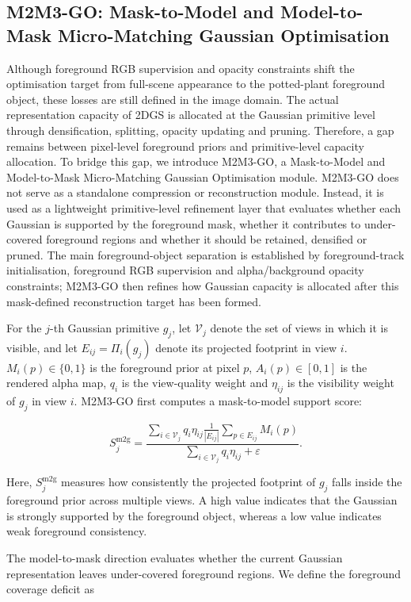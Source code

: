 \documentclass[a4paper]{cas-sc}
\begin{document}
\subsection{M2M3-GO: Mask-to-Model and Model-to-Mask Micro-Matching Gaussian Optimisation}\label{sec:m2m3-go}

Although foreground RGB supervision and opacity constraints shift the optimisation target from full-scene appearance to the potted-plant foreground object, these losses are still defined in the image domain. The actual representation capacity of 2DGS is allocated at the Gaussian primitive level through densification, splitting, opacity updating and pruning. Therefore, a gap remains between pixel-level foreground priors and primitive-level capacity allocation. To bridge this gap, we introduce M2M3-GO, a Mask-to-Model and Model-to-Mask Micro-Matching Gaussian Optimisation module. M2M3-GO does not serve as a standalone compression or reconstruction module. Instead, it is used as a lightweight primitive-level refinement layer that evaluates whether each Gaussian is supported by the foreground mask, whether it contributes to under-covered foreground regions and whether it should be retained, densified or pruned. The main foreground-object separation is established by foreground-track initialisation, foreground RGB supervision and alpha/background opacity constraints; M2M3-GO then refines how Gaussian capacity is allocated after this mask-defined reconstruction target has been formed.

For the \(j\)-th Gaussian primitive \(g_j\), let \(\mathcal{V}_j\) denote the set of views in which it is visible, and let \(E_{ij}=\Pi_i(g_j)\) denote its projected footprint in view \(i\). \(M_i(p)\in\{0,1\}\) is the foreground prior at pixel \(p\), \(A_i(p)\in[0,1]\) is the rendered alpha map, \(q_i\) is the view-quality weight and \(\eta_{ij}\) is the visibility weight of \(g_j\) in view \(i\). M2M3-GO first computes a mask-to-model support score:

\[
S^{\text{m2g}}_j=
\frac{
\sum_{i\in \mathcal{V}_j} q_i \eta_{ij}
\frac{1}{|E_{ij}|}\sum_{p\in E_{ij}} M_i(p)
}{
\sum_{i\in \mathcal{V}_j} q_i \eta_{ij}+\varepsilon
}.
\]

Here, \(S^{\text{m2g}}_j\) measures how consistently the projected footprint of \(g_j\) falls inside the foreground prior across multiple views. A high value indicates that the Gaussian is strongly supported by the foreground object, whereas a low value indicates weak foreground consistency.

The model-to-mask direction evaluates whether the current Gaussian representation leaves under-covered foreground regions. We define the foreground coverage deficit as
\end{document}
